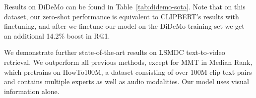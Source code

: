 Results on DiDeMo can be found in Table~\ref{tab:didemo-sota}. Note that on this dataset, our zero-shot performance is equivalent to CLIPBERT's results with finetuning, and after we finetune our model on the DiDeMo training set we get an additional 14.2\% boost in R@1.
\begin{table}\centering
\caption{Text-to-video retrieval results on the DiDeMo test set. We show results with and without ground truth proposals (GT prop.) as well as with finetuning and without (zero-shot).}
\vspace{-1em}
\label{tab:didemo-sota}
\end{table} 
We demonstrate further state-of-the-art results on LSMDC text-to-video retrieval.  We outperform all previous methods, except for MMT in Median Rank, which pretrains on HowTo100M, a dataset consisting of over 100M clip-text pairs and contains multiple experts as well as audio modalities. Our model uses visual information alone.
